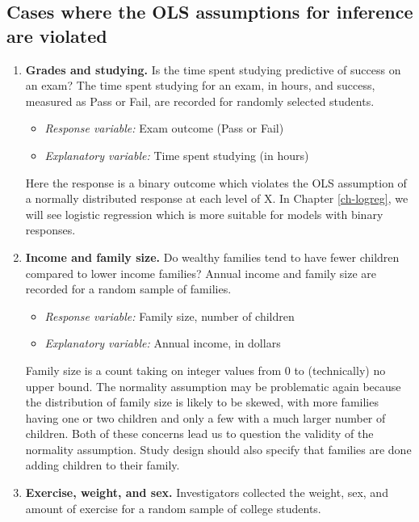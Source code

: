 \documentclass[
]{krantz}
\providecommand{\tightlist}{%
  \setlength{\itemsep}{0pt}\setlength{\parskip}{0pt}}
\begin{document}
\hypertarget{cases-where-the-ols-assumptions-for-inference-are-violated}{%
\subsection{Cases where the OLS assumptions for inference are violated}\label{cases-where-the-ols-assumptions-for-inference-are-violated}}

\begin{enumerate}
\def\labelenumi{\arabic{enumi})}
\item
  \textbf{Grades and studying.} Is the time spent studying predictive of success on an exam? The time spent studying for an exam, in hours, and success, measured as Pass or Fail, are recorded for randomly selected students.

  \begin{itemize}
  \tightlist
  \item
    \emph{Response variable:} Exam outcome (Pass or Fail)
  \item
    \emph{Explanatory variable:} Time spent studying (in hours)\\
  \end{itemize}

  Here the response is a binary outcome which violates the OLS assumption of a normally distributed response at each level of X. In Chapter \ref{ch-logreg}, we will see logistic regression which is more suitable for models with binary responses.
\item
  \textbf{Income and family size.} Do wealthy families tend to have fewer children compared to lower income families? Annual income and family size are recorded for a random sample of families.

  \begin{itemize}
  \tightlist
  \item
    \emph{Response variable:} Family size, number of children
  \item
    \emph{Explanatory variable:} Annual income, in dollars\\
  \end{itemize}

  Family size is a count taking on integer values from 0 to (technically) no upper bound. The normality assumption may be problematic again because the distribution of family size is likely to be skewed, with more families having one or two children and only a few with a much larger number of children. Both of these concerns lead us to question the validity of the normality assumption. Study design should also specify that families are done adding children to their family.
\item
  \textbf{Exercise, weight, and sex.} Investigators collected the weight, sex, and amount of exercise for a random sample of college students.


\end{enumerate}
\end{document}
